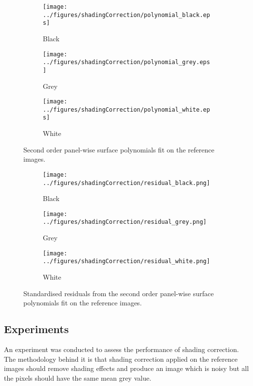 \documentclass[a4paper]{proc}
\begin{document}
\begin{figure*}
	\centering
	\begin{subfigure}{0.45\textwidth}
		\centering
		\texttt{[image: ../figures/shadingCorrection/polynomial\_black.eps]}
		\caption{Black}
	\end{subfigure}
	\begin{subfigure}{0.45\textwidth}
		\centering
		\texttt{[image: ../figures/shadingCorrection/polynomial\_grey.eps]}
		\caption{Grey}
	\end{subfigure}
	\begin{subfigure}{0.45\textwidth}
		\centering
		\texttt{[image: ../figures/shadingCorrection/polynomial\_white.eps]}
		\caption{White}
	\end{subfigure}
	\caption{Second order panel-wise surface polynomials fit on the reference images.}
	\label{fig:polynomial_shadingCorrection}
\end{figure*}

\begin{figure*}
	\centering
	\begin{subfigure}{0.45\textwidth}
		\centering
		\texttt{[image: ../figures/shadingCorrection/residual\_black.png]}
		\caption{Black}
	\end{subfigure}
	\begin{subfigure}{0.45\textwidth}
		\centering
		\texttt{[image: ../figures/shadingCorrection/residual\_grey.png]}
		\caption{Grey}
	\end{subfigure}
	\begin{subfigure}{0.45\textwidth}
		\centering
		\texttt{[image: ../figures/shadingCorrection/residual\_white.png]}
		\caption{White}
	\end{subfigure}
	\caption{Standardised residuals from the second order panel-wise surface polynomials fit on the reference images.}
	\label{fig:polynomial_residual}
\end{figure*}

\subsection{Experiments}

An experiment was conducted to assess the performance of shading correction. The methodology behind it is that shading correction applied on the reference images should remove shading effects and produce an image which is noisy but all the pixels should have the same mean grey value.
\end{document}
